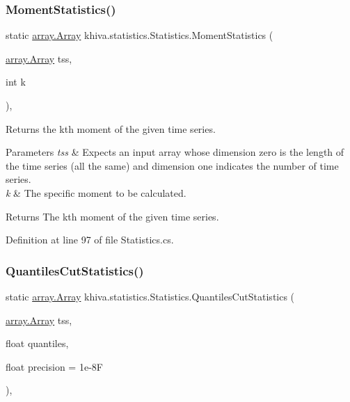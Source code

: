 \subsubsection{\texorpdfstring{Moment\+Statistics()}{MomentStatistics()}}
{\footnotesize\ttfamily static \mbox{\hyperlink{classkhiva_1_1array_1_1_array}{array.\+Array}} khiva.\+statistics.\+Statistics.\+Moment\+Statistics (\begin{DoxyParamCaption}\item[{\mbox{\hyperlink{classkhiva_1_1array_1_1_array}{array.\+Array}}}]{tss,  }\item[{int}]{k }\end{DoxyParamCaption})\hspace{0.3cm}{\ttfamily [inline]}, {\ttfamily [static]}}



Returns the kth moment of the given time series. 


\begin{DoxyParams}{Parameters}
{\em tss} & Expects an input array whose dimension zero is the length of the time series (all the same) and dimension one indicates the number of time series.\\
\hline
{\em k} & The specific moment to be calculated.\\
\hline
\end{DoxyParams}
\begin{DoxyReturn}{Returns}
The kth moment of the given time series.
\end{DoxyReturn}


Definition at line 97 of file Statistics.\+cs.

\mbox{\label{classkhiva_1_1statistics_1_1_statistics_a6cdf0ca7e81e5564d91f9b630f18e43d}} 
\subsubsection{\texorpdfstring{Quantiles\+Cut\+Statistics()}{QuantilesCutStatistics()}}
{\footnotesize\ttfamily static \mbox{\hyperlink{classkhiva_1_1array_1_1_array}{array.\+Array}} khiva.\+statistics.\+Statistics.\+Quantiles\+Cut\+Statistics (\begin{DoxyParamCaption}\item[{\mbox{\hyperlink{classkhiva_1_1array_1_1_array}{array.\+Array}}}]{tss,  }\item[{float}]{quantiles,  }\item[{float}]{precision = {\ttfamily 1e-\/8F} }\end{DoxyParamCaption})\hspace{0.3cm}{\ttfamily [inline]}, {\ttfamily [static]}}



